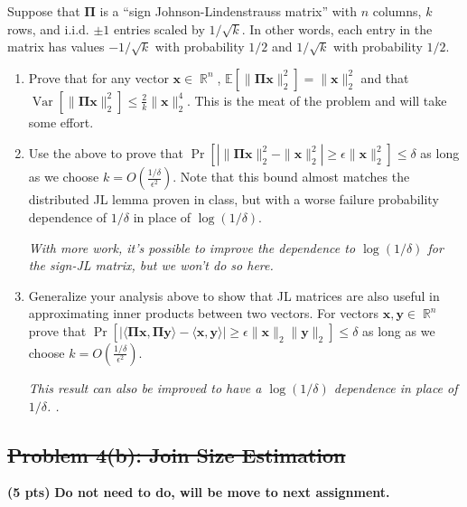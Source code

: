 \documentclass[10pt]{article}
\DeclareMathOperator{\R}{\mathbb{R}}
\newcommand{\E}{\mathbb{E}}
\DeclareMathOperator{\Var}{Var}
\newcommand{\bs}[1]{\boldsymbol{#1}}
\newcommand{\bv}[1]{\mathbf{#1}}
\begin{document}
Suppose that $\bs{\Pi}$ is a ``sign Johnson-Lindenstrauss matrix'' with $n$ columns, $k$ rows, and i.i.d. $\pm 1$ entries scaled by $1/\sqrt{k}$. In other words, each entry in the matrix has values $-1/\sqrt{k}$ with probability $1/2$ and $1/\sqrt{k}$ with probability $1/2$.
\begin{enumerate}
	\item Prove that for any vector $\bv{x}\in \R^n$, $\E[\|\bs{\Pi}\bv{x}\|_2^2] = \|\bv{x}\|_2^2$ and that $\Var[\|\bs{\Pi}\bv{x}\|_2^2] \leq \frac{2}{k}\|\bv{x}\|_2^4$. This is the meat of the problem and will take some effort. 
	\vspace{.5em}

	
	\item Use the above to prove that $\Pr\left[\left|\|\bs{\Pi}\bv{x}\|_2^2 - \|\bv{x}\|_2^2\right| \geq \epsilon\|\bv{x}\|_2^2 \right] \leq \delta$ as long as we choose $k = O\left(\frac{1/\delta}{\epsilon^2}\right)$. Note that this bound almost matches the distributed JL lemma proven in class, but with a worse failure probability dependence of $1/\delta$ in place of $\log(1/\delta)$. 
	\vspace{.5em}
	
	\textit{With more work, it's possible to improve the dependence to $\log(1/\delta)$ for the sign-JL matrix, but we won't do so here.}
	
	\item Generalize your analysis above to show that JL matrices are also useful in approximating inner products between two vectors. For vectors $\bv{x},\bv{y}\in \R^n$ prove that $\Pr\left[\left|\langle \bs{\Pi}\bv{x}, \bs{\Pi}\bv{y}\rangle -  \langle  \bv{x}, \bv{y}\rangle\right| \geq \epsilon\|\bv{x}\|_2\|\bv{y}\|_2\right] \leq \delta$ as long as we choose $k = O\left(\frac{1/\delta}{\epsilon^2}\right)$.
	
		\textit{This result can also be improved to have a $\log(1/\delta)$ dependence in place of $1/\delta$. .}
\end{enumerate}

\subsection{\sout{Problem 4(b): Join Size Estimation}} 
\noindent\textbf{(5 pts)} \textbf{Do not need to do, will be move to next assignment.}
\end{document}
